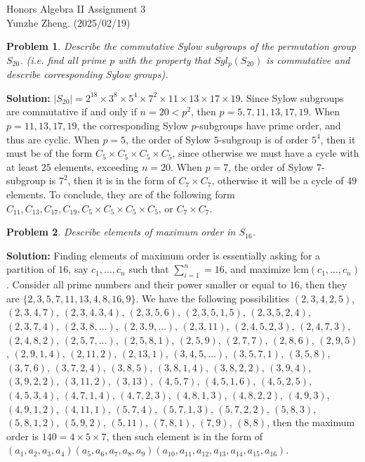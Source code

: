 \documentclass[12pt]{article}
\newtheorem{problem}{Problem}
\begin{document}
\noindent Honors Algebra II \hfill Assignment 3\\
Yunzhe Zheng. (2025/02/19)

\hrulefill

\begin{problem}
Describe the commutative Sylow subgroups of the permutation group $S_{20}$. (i.e. find all prime $p$ with the property that $Syl_{p}(S_{20})$ is commutative and describe corresponding Sylow groups).
\end{problem}

\textbf{Solution:} $|S_{20}|=2^{18}\times 3^{8}\times 5^{4}\times 7^{2}\times 11\times 13\times 17\times 19$. Since Sylow subgroups are commutative if and only if $n=20 < p^2$, then $p=5, 7, 11, 13, 17, 19$. When $p=11, 13, 17, 19$, the corresponding Sylow $p$-subgroups have prime order, and thus are cyclic. When $p=5$, the order of Sylow $5$-subgroup is of order $5^4$, then it must be of the form $C_{5}\times C_{5}\times C_{5}\times C_{5}$, since otherwise we must have a cycle with at least $25$ elements, exceeding $n = 20$. When $p=7$, the order of Sylow $7$-subgroup is $7^2$, then it is in the form of $C_{7}\times C_{7}$, otherwise it will be a cycle of $49$ elements. To conclude, they are of the following form $C_{11}, C_{13}, C_{17}, C_{19}, C_{5}\times C_{5}\times C_{5}\times C_{5}$, or $C_{7}\times C_{7}$.

\begin{problem}
Describe elements of maximum order in $S_{16}$.
\end{problem}

\textbf{Solution:} 
Finding elements of maximum order is essentially asking for a partition of $16$, say $c_{1},\dots, c_{n}$ such that $\sum\limits_{i=1}^{n}=16$, and maximize $\text{lcm}(c_{1}, \dots, c_{n})$. Consider all prime numbers and their power smaller or equal to $16$, then they are $\{2, 3, 5, 7, 11, 13, 4, 8, 16, 9\}$. We have the following possibilities $(2, 3, 4, 2, 5)$, $(2, 3, 4, 7)$, $(2, 3, 4, 3, 4)$, $(2, 3, 5, 6)$, $(2, 3, 5, 1, 5)$, $(2, 3, 5, 2, 4)$, $(2, 3, 7, 4)$, $(2, 3, 8, \dots)$, $(2, 3, 9, \dots)$, $(2, 3, 11)$, $(2, 4, 5, 2, 3)$, $(2, 4, 7, 3)$, $(2, 4, 8, 2)$, $(2, 5, 7, \dots)$, $(2, 5, 8, 1)$, $(2, 5, 9)$, $(2, 7, 7)$, $(2, 8, 6)$, $(2, 9, 5)$, $(2, 9, 1, 4)$, $(2, 11, 2)$, $(2, 13, 1)$, $(3, 4, 5, \dots)$, $(3, 5, 7, 1)$, $(3, 5, 8)$, $(3, 7, 6)$, $(3, 7, 2, 4)$, $(3, 8, 5)$, $(3, 8, 1, 4)$, $(3, 8, 2, 2)$, $(3, 9, 4)$, $(3, 9, 2, 2)$, $(3, 11, 2)$, $(3, 13)$, $(4, 5, 7)$, $(4, 5, 1, 6)$, $(4, 5, 2, 5)$, $(4, 5, 3, 4)$, $(4, 7, 1, 4)$, $(4, 7, 2, 3)$, $(4, 8, 1, 3)$, $(4, 8, 2, 2)$, $(4, 9, 3)$, $(4, 9, 1, 2)$, $(4, 11, 1)$, $(5, 7, 4)$, $(5, 7, 1, 3)$, $(5, 7, 2, 2)$, $(5, 8, 3)$, $(5, 8, 1, 2)$, $(5, 9, 2)$, $(5, 11)$, $(7, 8, 1)$, $(7, 9)$, $(8, 8)$, then the maximum order is $140=4\times 5\times 7$, then such element is in the form of $(a_{1}, a_{2}, a_{3}, a_{4})(a_{5}, a_{6}, a_{7}, a_{8}, a_{9})(a_{10}, a_{11}, a_{12}, a_{13}, a_{14}, a_{15}, a_{16})$. 
\end{document}
